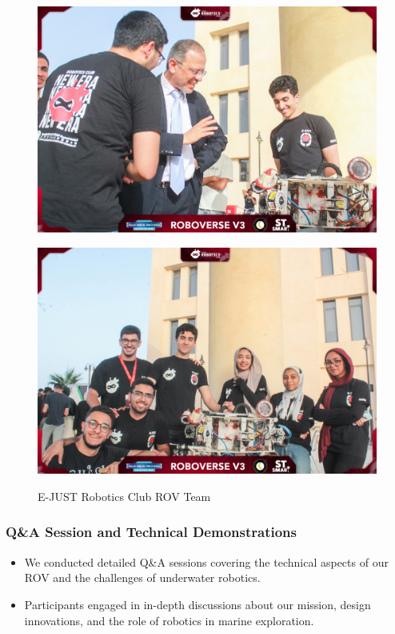 \documentclass[11pt, twocolumn]{article}
\begin{document}
\begin{figure}[h]
    \centering
    \begin{minipage}{0.48\textwidth}
        \centering
        \includegraphics[width=\textwidth]{Images/ROV1.jpg}
        
        \label{fig:figure1}
    \end{minipage}
    \hfill
    \begin{minipage}{0.48\textwidth}
        \centering
        \includegraphics[width=\textwidth]{Images/ROV2.jpg}
      
        \label{fig:figure2}
    \end{minipage}
    \caption{E-JUST Robotics Club ROV Team}
    \label{fig:both_figures}
\end{figure}

\subsubsection{Q\&A Session and Technical Demonstrations}
\begin{itemize}
    \item We conducted detailed Q\&A sessions covering the technical aspects of our ROV and the challenges of underwater robotics.
    \item Participants engaged in in-depth discussions about our mission, design innovations, and the role of robotics in marine exploration.
\end{itemize}
\end{document}

